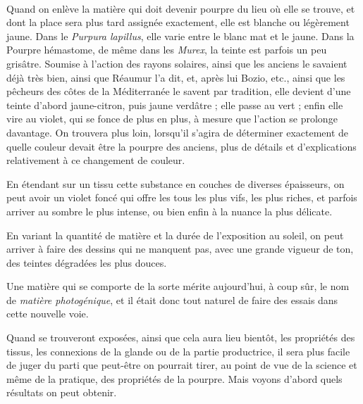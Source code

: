 \documentclass[a4paper, 11pt, oneside, polutonikogreek, french]{article}
\begin{document}
\paragraph{}
Quand on enlève la matière qui doit devenir pourpre du lieu où elle se trouve, et dont la place sera plus tard assignée exactement, elle est blanche ou légèrement jaune. Dans le \emph{Purpura lapillus}, elle varie entre le blanc mat et le jaune. Dans la Pourpre hémastome, de même dans les \emph{Murex}, la teinte est parfois un peu grisâtre. Soumise à l'action des rayons solaires, ainsi que les anciens le savaient déjà très bien, ainsi que Réaumur l'a dit, et, après lui Bozio, etc., ainsi que les pêcheurs des côtes de la Méditerranée le savent par tradition, elle devient d'une teinte d'abord jaune-citron, puis jaune verdâtre ; elle passe au vert ; enfin elle vire au violet, qui se fonce de plus en plus, à mesure que l'action se prolonge davantage. On trouvera plus loin, lorsqu'il s'agira de déterminer exactement de quelle couleur devait être la pourpre des anciens, plus de détails et d'explications relativement à ce changement de couleur.

En étendant sur un tissu cette substance en couches de diverses épaisseurs, on peut avoir un violet foncé qui offre les tous les plus vifs, les plus riches, et parfois arriver au sombre le plus intense, ou bien enfin à la nuance la plus délicate.

En variant la quantité de matière et la durée de l'exposition au soleil, on peut arriver à faire des dessins qui ne manquent pas, avec une grande vigueur de ton, des teintes dégradées les plus douces.

Une matière qui se comporte de la sorte mérite aujourd'hui, à coup sûr, le nom de \emph{matière photogénique}, et il était donc tout naturel de faire des essais dans cette nouvelle voie.

Quand se trouveront exposées, ainsi que cela aura lieu bientôt, les propriétés des tissus, les connexions de la glande ou de la partie productrice, il sera plus facile de juger du parti que peut-être on pourrait tirer, au point de vue de la science et même de la pratique, des propriétés de la pourpre. Mais voyons d'abord quels résultats on peut obtenir.
\end{document}
